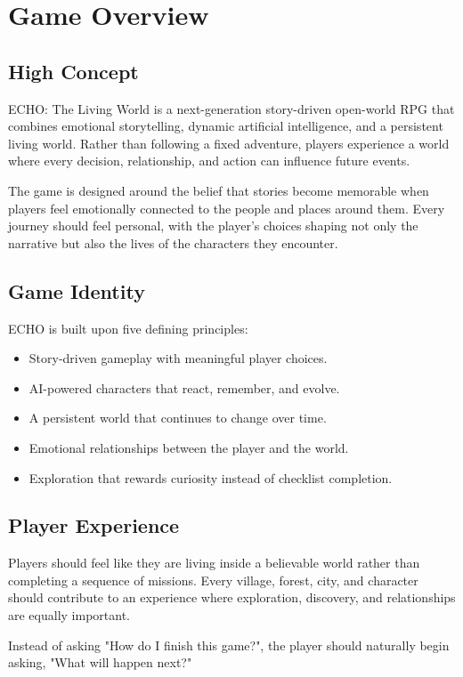 \chapter{Game Overview}

\section{High Concept}

ECHO: The Living World is a next-generation story-driven open-world RPG that combines emotional storytelling, dynamic artificial intelligence, and a persistent living world. Rather than following a fixed adventure, players experience a world where every decision, relationship, and action can influence future events.

The game is designed around the belief that stories become memorable when players feel emotionally connected to the people and places around them. Every journey should feel personal, with the player's choices shaping not only the narrative but also the lives of the characters they encounter.

\section{Game Identity}

ECHO is built upon five defining principles:

\begin{itemize}
    \item Story-driven gameplay with meaningful player choices.
    \item AI-powered characters that react, remember, and evolve.
    \item A persistent world that continues to change over time.
    \item Emotional relationships between the player and the world.
    \item Exploration that rewards curiosity instead of checklist completion.
\end{itemize}

\section{Player Experience}

Players should feel like they are living inside a believable world rather than completing a sequence of missions. Every village, forest, city, and character should contribute to an experience where exploration, discovery, and relationships are equally important.

Instead of asking "How do I finish this game?", the player should naturally begin asking, "What will happen next?"